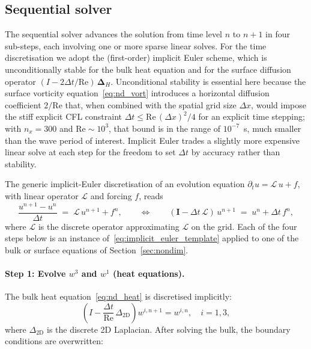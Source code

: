\documentclass{article}
\newcommand{\Rey}{\mathrm{Re}}
\begin{document}
\subsection{Sequential solver}
\label{sec:sequential}

The sequential solver advances the solution from time level $n$ to $n+1$ in four sub-steps, each involving one or more sparse linear solves.
\color{blue}
For the time discretisation we adopt the (first-order) implicit Euler scheme, which is unconditionally stable for the bulk heat equation and for the surface diffusion operator $(I - 2\Delta t/\Rey)\,\bm{\Delta}_H$.
Unconditional stability is essential here because the surface vorticity equation~\eqref{eq:nd_vort} introduces a horizontal diffusion coefficient $2/\Rey$ that, when combined with the spatial grid size $\Delta x$, would impose the stiff explicit CFL constraint $\Delta t \le \Rey\,(\Delta x)^2/4$ for an explicit time stepping; with $n_x = 300$ and $\Rey \sim 10^3$, that bound is in the range of $10^{-7}$~s, much smaller than the wave period of interest.
Implicit Euler trades a slightly more expensive linear solve at each step for the freedom to set $\Delta t$ by accuracy rather than stability.

The generic implicit-Euler discretisation of an evolution equation $\partial_t u = \mathcal{L}\, u + f$, with linear operator $\mathcal{L}$ and forcing $f$, reads
\begin{equation}
    \frac{u^{n+1} - u^n}{\Delta t} \;=\; \mathcal{L}\, u^{n+1} + f^{n}, \qquad \Longleftrightarrow \qquad (\bm{I} - \Delta t\,\bm{\mathcal{L}})\,u^{n+1} \;=\; u^n + \Delta t\,f^n, \label{eq:implicit_euler_template}
\end{equation}
where $\bm{\mathcal{L}}$ is the discrete operator approximating $\mathcal{L}$ on the grid.
Each of the four steps below is an instance of~\eqref{eq:implicit_euler_template} applied to one of the bulk or surface equations of Section~\ref{sec:nondim}.
\color{black}

\paragraph{Step 1: Evolve $w^3$ and $w^1$ (heat equations).}
The bulk heat equation~\eqref{eq:nd_heat} is discretised implicitly:
\begin{equation}
    \left(I - \frac{\Delta t}{\Rey}\,\Delta_{2\text{D}}\right) w^{i,n+1} = w^{i,n}, \quad i = 1, 3,
    \label{eq:heat_implicit}
\end{equation}
where $\Delta_{2\text{D}}$ is the discrete 2D Laplacian.
After solving the bulk, the boundary conditions are overwritten:
\end{document}
